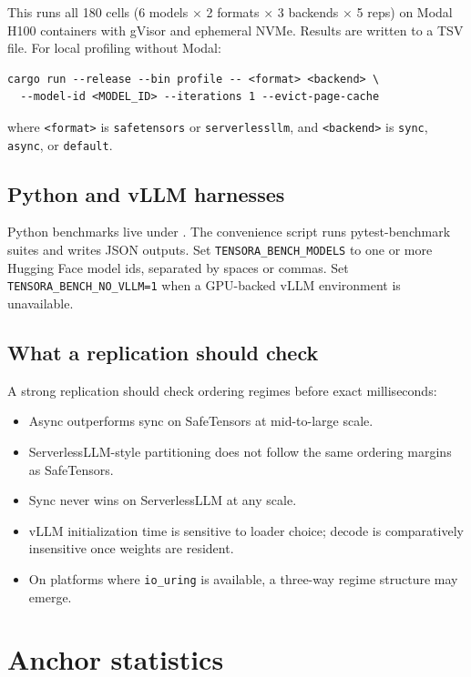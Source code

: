 This runs all 180 cells (6 models $\times$ 2 formats $\times$ 3 backends $\times$ 5 reps) on Modal H100 containers with gVisor and ephemeral NVMe. Results are written to a TSV file. For local profiling without Modal:

\begin{verbatim}
cargo run --release --bin profile -- <format> <backend> \
  --model-id <MODEL_ID> --iterations 1 --evict-page-cache
\end{verbatim}

\noindent where \texttt{<format>} is \texttt{safetensors} or \texttt{serverlessllm}, and \texttt{<backend>} is \texttt{sync}, \texttt{async}, or \texttt{default}.

\subsection{Python and vLLM harnesses}

Python benchmarks live under . The convenience script  runs pytest-benchmark suites and writes JSON outputs. Set \texttt{TENSORA\_BENCH\_MODELS} to one or more Hugging Face model ids, separated by spaces or commas. Set \texttt{TENSORA\_BENCH\_NO\_VLLM=1} when a GPU-backed vLLM environment is unavailable.

\subsection{What a replication should check}

A strong replication should check ordering regimes before exact milliseconds:
\begin{itemize}
\item Async outperforms sync on SafeTensors at mid-to-large scale.
\item ServerlessLLM-style partitioning does not follow the same ordering margins as SafeTensors.
\item Sync never wins on ServerlessLLM at any scale.
\item vLLM initialization time is sensitive to loader choice; decode is comparatively insensitive once weights are resident.
\item On platforms where \texttt{io\_uring} is available, a three-way regime structure may emerge.
\end{itemize}

\section{Anchor statistics}
\label{app:anchor-stats}

